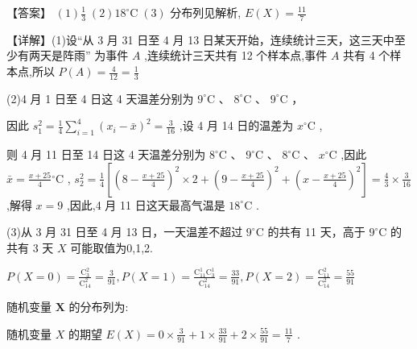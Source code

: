 \documentclass[10pt]{article}
\begin{document}
【答案】 \(\left( 1\right) \frac{1}{3}\;\left( 2\right) {18}^{ \circ  }\mathrm{C}\;\left( 3\right)\) 分布列见解析, \(E\left( X\right)  = \frac{11}{7}\)

【详解】(1)设“从 3 月 31 日至 4 月 13 日某天开始，连续统计三天，这三天中至少有两天是阵雨” 为事件 \(A\) ,连续统计三天共有 12 个样本点,事件 \(A\) 共有 4 个样本点,所以 \(P\left( A\right)  = \frac{4}{12} = \frac{1}{3}\)

(2)4 月 1 日至 4 日这 4 天温差分别为 \({9}^{ \circ  }\mathrm{C}\) 、 \({8}^{ \circ  }\mathrm{C}\) 、 \({9}^{ \circ  }\mathrm{C}\) ，

因此 \({s}_{1}^{2} = \frac{1}{4}\mathop{\sum }\limits_{{i = 1}}^{4}{\left( {x}_{i} - \bar{x}\right) }^{2} = \frac{3}{16}\) ,设 4 月 14 日的温差为 \({x}^{ \circ  }\mathrm{C}\) ,

则 4 月 11 日至 14 日这 4 天温差分别为 \({8}^{ \circ  }\mathrm{C}\text{ 、 }{9}^{ \circ  }\mathrm{C}\text{ 、 }{8}^{ \circ  }\mathrm{C}\text{ 、 }{x}^{ \circ  }\mathrm{C}\) ,因此 \(\bar{x} = \frac{x + {25}}{4}{}^{ \circ  }\mathrm{C}\) , \({s}_{2}^{2} = \frac{1}{4}\left\lbrack  {{\left( 8 - \frac{x + {25}}{4}\right) }^{2} \times  2 + {\left( 9 - \frac{x + {25}}{4}\right) }^{2} + {\left( x - \frac{x + {25}}{4}\right) }^{2}}\right\rbrack   = \frac{4}{3} \times  \frac{3}{16}\) ,解得 \(x = 9\) ,因此,4 月 11 日这天最高气温是 \({18}^{ \circ  }\mathrm{C}\) .

(3)从 3 月 31 日至 4 月 13 日，一天温差不超过 \({9}^{ \circ  }\mathrm{C}\) 的共有 11 天，高于 \({9}^{ \circ  }\mathrm{C}\) 的共有 3 天 \(X\) 可能取值为0,1,2.

\(P\left( {X = 0}\right)  = \frac{{\mathrm{C}}_{3}^{2}}{{\mathrm{C}}_{14}^{2}} = \frac{3}{91},P\left( {X = 1}\right)  = \frac{{\mathrm{C}}_{11}^{1}{\mathrm{C}}_{3}^{1}}{{\mathrm{C}}_{14}^{2}} = \frac{33}{91},P\left( {X = 2}\right)  = \frac{{\mathrm{C}}_{11}^{2}}{{\mathrm{C}}_{14}^{2}} = \frac{55}{91}\)

随机变量 \(\mathbf{X}\) 的分布列为:

\begin{center}
\end{center}

随机变量 \(X\) 的期望 \(E\left( X\right)  = 0 \times  \frac{3}{91} + 1 \times  \frac{33}{91} + 2 \times  \frac{55}{91} = \frac{11}{7}\) .
\end{document}
